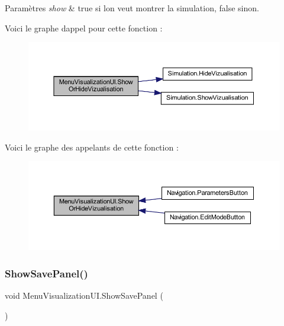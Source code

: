 \begin{DoxyParams}{Paramètres}
{\em show} & true si l\textquotesingle{}on veut montrer la simulation, false sinon.\\
\hline
\end{DoxyParams}
Voici le graphe d\textquotesingle{}appel pour cette fonction \+:
\nopagebreak
\begin{figure}[H]
\begin{center}
\leavevmode
\includegraphics[width=350pt]{class_menu_visualization_u_i_ab06398a58bc8438ead7172d9e09b8bca_cgraph}
\end{center}
\end{figure}
Voici le graphe des appelants de cette fonction \+:
\nopagebreak
\begin{figure}[H]
\begin{center}
\leavevmode
\includegraphics[width=350pt]{class_menu_visualization_u_i_ab06398a58bc8438ead7172d9e09b8bca_icgraph}
\end{center}
\end{figure}
\mbox{\label{class_menu_visualization_u_i_aabfef8a72ef59e04916f6d95a1274431}} 
\subsubsection{\texorpdfstring{Show\+Save\+Panel()}{ShowSavePanel()}}
{\footnotesize\ttfamily void Menu\+Visualization\+U\+I.\+Show\+Save\+Panel (\begin{DoxyParamCaption}{ }\end{DoxyParamCaption})\hspace{0.3cm}{\ttfamily [inline]}}



